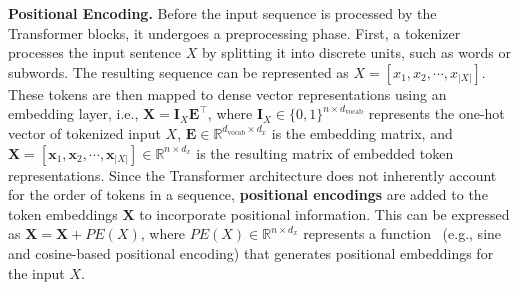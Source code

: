 \noindent \textbf{Positional Encoding.}
Before the input sequence is processed by the Transformer blocks, it undergoes a preprocessing phase. 
First, a tokenizer processes the input sentence $X$ by splitting it into discrete units, such as words or subwords. The resulting sequence can be represented as 
${X} = [x_1, x_2, \cdots, x_{|X|}]$.
These tokens are then mapped to dense vector representations using an embedding layer, i.e., $\mathbf{X} = \mathbf{I}_X  \mathbf{E}^{\top}$,
where $\mathbf{I}_{X} \in \{0,1\}^{n \times d_{\text{vocab}}}$ represents the one-hot vector of tokenized input $X$, $\mathbf{E} \in \mathbb{R}^{d_{\text{vocab}} \times d_x}$ is the embedding matrix, 
and $\mathbf{X}=[\mathbf{x}_1, \mathbf{x}_2, \cdots, \mathbf{x}_{|X|}]\in \mathbb{R}^{n \times d_{x}}$ is the resulting matrix of embedded token representations.
Since the Transformer architecture does not inherently account for the order of tokens in a sequence, \textbf{positional encodings} are added to the token embeddings $\mathbf{X}$ to incorporate positional information. This can be expressed as $\mathbf{X}=\mathbf{X}+ PE(X)$,
where $PE(X) \in \mathbb{R}^{n \times d_x}$ represents a function~\cite{zhao2023length,zheng2021rethinking,su2024roformer} (e.g., sine and cosine-based positional encoding) that generates positional embeddings for the input ${X}$.


